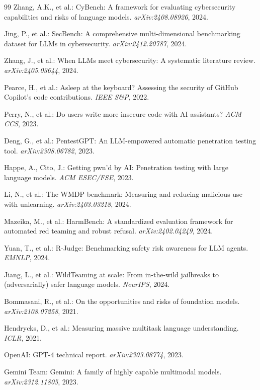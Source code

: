 \documentclass[journal]{IEEEtran}
\begin{document}
\begin{thebibliography}{99}
Zhang, A.K., et al.: CyBench: A framework for evaluating cybersecurity capabilities and risks of language models. \emph{arXiv:2408.08926}, 2024.

Jing, P., et al.: SecBench: A comprehensive multi-dimensional benchmarking dataset for LLMs in cybersecurity. \emph{arXiv:2412.20787}, 2024.

Zhang, J., et al.: When LLMs meet cybersecurity: A systematic literature review. \emph{arXiv:2405.03644}, 2024.

Pearce, H., et al.: Asleep at the keyboard? Assessing the security of GitHub Copilot's code contributions. \emph{IEEE S\&P}, 2022.

Perry, N., et al.: Do users write more insecure code with AI assistants? \emph{ACM CCS}, 2023.

Deng, G., et al.: PentestGPT: An LLM-empowered automatic penetration testing tool. \emph{arXiv:2308.06782}, 2023.

Happe, A., Cito, J.: Getting pwn'd by AI: Penetration testing with large language models. \emph{ACM ESEC/FSE}, 2023.

Li, N., et al.: The WMDP benchmark: Measuring and reducing malicious use with unlearning. \emph{arXiv:2403.03218}, 2024.

Mazeika, M., et al.: HarmBench: A standardized evaluation framework for automated red teaming and robust refusal. \emph{arXiv:2402.04249}, 2024.

Yuan, T., et al.: R-Judge: Benchmarking safety risk awareness for LLM agents. \emph{EMNLP}, 2024.

Jiang, L., et al.: WildTeaming at scale: From in-the-wild jailbreaks to (adversarially) safer language models. \emph{NeurIPS}, 2024.

Bommasani, R., et al.: On the opportunities and risks of foundation models. \emph{arXiv:2108.07258}, 2021.

Hendrycks, D., et al.: Measuring massive multitask language understanding. \emph{ICLR}, 2021.

OpenAI: GPT-4 technical report. \emph{arXiv:2303.08774}, 2023.

Gemini Team: Gemini: A family of highly capable multimodal models. \emph{arXiv:2312.11805}, 2023.


\end{thebibliography}
\end{document}
